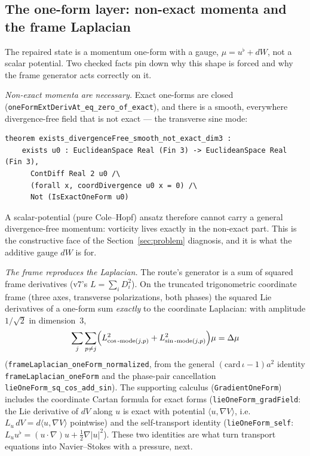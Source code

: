 \documentclass[11pt]{article}
\theoremstyle{definition}
\begin{document}
\subsection{The one-form layer: non-exact momenta and the frame Laplacian}
\label{sec:oneform}

The repaired state is a momentum one-form with a gauge, $\mu=u^\flat+dW$,
not a scalar potential.  Two checked facts pin down why this shape is forced
and why the frame generator acts correctly on it.

\emph{Non-exact momenta are necessary.}  Exact one-forms are closed
(\texttt{oneFormExtDerivAt\_eq\_zero\_of\_exact}), and there is a smooth,
everywhere divergence-free field that is not exact --- the transverse sine
mode:

\begin{lstlisting}[language={}]
theorem exists_divergenceFree_smooth_not_exact_dim3 :
    exists u0 : EuclideanSpace Real (Fin 3) -> EuclideanSpace Real (Fin 3),
      ContDiff Real 2 u0 /\
      (forall x, coordDivergence u0 x = 0) /\
      Not (IsExactOneForm u0)
\end{lstlisting}

A scalar-potential (pure Cole--Hopf) ansatz therefore cannot carry a general
divergence-free momentum: vorticity lives exactly in the non-exact part.
This is the constructive face of the Section~\ref{sec:problem} diagnosis, and
it is what the additive gauge $dW$ is for.

\emph{The frame reproduces the Laplacian.}  The route's generator is a sum of
squared frame derivatives (v7's $L=\sum_i D_i^2$).  On the truncated
trigonometric coordinate frame (three axes, transverse polarizations, both
phases) the squared Lie derivatives of a one-form sum \emph{exactly} to the
coordinate Laplacian: with amplitude $1/\sqrt2$ in dimension~3,
\[
  \sum_{j}\sum_{p\ne j}
    \Bigl(L^2_{\cos\text{-mode}(j,p)} + L^2_{\sin\text{-mode}(j,p)}\Bigr)\mu
  = \Delta\mu
\]
(\texttt{frameLaplacian\_oneForm\_normalized}, from the general
$(\mathrm{card}\,\iota-1)a^2$ identity \texttt{frameLaplacian\_oneForm} and
the phase-pair cancellation \texttt{lieOneForm\_sq\_cos\_add\_sin}).  The
supporting calculus (\texttt{GradientOneForm}) includes the coordinate Cartan
formula for exact forms (\texttt{lieOneForm\_gradField}: the Lie derivative
of $dV$ along $u$ is exact with potential $\langle u,\nabla V\rangle$, i.e.\
$L_u\,dV = d\langle u,\nabla V\rangle$ pointwise) and the self-transport
identity (\texttt{lieOneForm\_self}: $L_u u^\flat = (u\cdot\nabla)u +
\tfrac12\nabla|u|^2$).  These two identities are what turn transport
equations into Navier--Stokes with a pressure, next.
\end{document}

